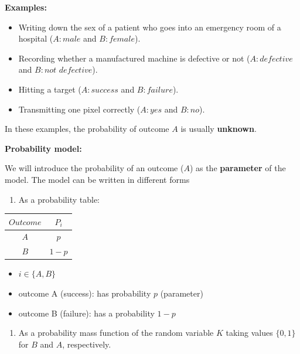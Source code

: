 \documentclass[
]{book}
\providecommand{\tightlist}{%
  \setlength{\itemsep}{0pt}\setlength{\parskip}{0pt}}
\begin{document}
\textbf{Examples:}

\begin{itemize}
\item
  Writing down the sex of a patient who goes into an emergency room of a hospital (\(A:male\) and \(B:female\)).
\item
  Recording whether a manufactured machine is defective or not (\(A:defective\) and \(B:not \,\, defective\)).
\item
  Hitting a target (\(A:success\) and \(B:failure\)).
\item
  Transmitting one pixel correctly (\(A:yes\) and \(B:no\)).
\end{itemize}

In these examples, the probability of outcome \(A\) is usually \textbf{unknown}.

\textbf{Probability model:}

We will introduce the probability of an outcome (\(A\)) as the \textbf{parameter} of the model. The model can be written in different forms

\begin{enumerate}
\def\labelenumi{\arabic{enumi})}
\tightlist
\item
  As a probability table:
\end{enumerate}

\begin{longtable}[]{@{}cc@{}}
\toprule\noalign{}
\(Outcome\) & \(P_i\) \\
\midrule\noalign{}
\endhead
\bottomrule\noalign{}
\endlastfoot
\(A\) & \(p\) \\
\(B\) & \(1-p\) \\
\end{longtable}

\begin{itemize}
\tightlist
\item
  \(i \in \{A,B\}\)
\item
  outcome A (success): has probability \(p\) (parameter)
\item
  outcome B (failure): has a probability \(1-p\)
\end{itemize}

\begin{enumerate}
\def\labelenumi{\arabic{enumi})}
\setcounter{enumi}{1}
\tightlist
\item
  As a probability mass function of the random variable \(K\) taking values \(\{0, 1\}\) for \(B\) and \(A\), respectively.
\end{enumerate}
\end{document}
